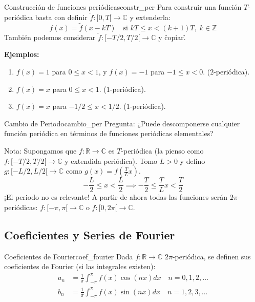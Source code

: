 \begin{nota}{Construcción de funciones periódicas}{constr_per}
Para construir una función $T$-periódica basta con definir $\tilde{f}: [0, T[ \to \mathbb{C}$ y extenderla:
$$ f(x) = \tilde{f}(x - kT) \quad \text{si } kT \le x < (k+1)T, \; k \in \mathbb{Z} $$
También podemos considerar $\tilde{f}: [-T/2, T/2[ \to \mathbb{C}$ y \"copiar\".

\textbf{Ejemplos:}
\begin{enumerate}
    \item $f(x) = 1$ para $0 \le x < 1$, y $f(x) = -1$ para $-1 \le x < 0$. ($2$-periódica).
    \item $f(x) = x$ para $0 \le x < 1$. ($1$-periódica).
    \item $f(x) = x$ para $-1/2 \le x < 1/2$. ($1$-periódica).
\end{enumerate}
\end{nota}

\begin{observacion}{Cambio de Periodo}{cambio_per}
Pregunta: ¿Puede descomponerse cualquier función periódica en términos de funciones periódicas elementales?

Nota: Supongamos que $f: \mathbb{R} \to \mathbb{C}$ es $T$-periódica (la pienso como $f: [-T/2, T/2[ \to \mathbb{C}$ y extendida periódica). Tomo $L > 0$ y defino $g: [-L/2, L/2[ \to \mathbb{C}$ como $g(x) = f\left(\frac{T}{L}x\right)$.
$$ -\frac{L}{2} \le x < \frac{L}{2} \implies -\frac{T}{2} \le \frac{T}{L}x < \frac{T}{2} $$
¡El periodo no es relevante! A partir de ahora todas las funciones serán $2\pi$-periódicas:
$f: [-\pi, \pi[ \to \mathbb{C}$ o $f: [0, 2\pi[ \to \mathbb{C}$.
\end{observacion}

\subsection{Coeficientes y Series de Fourier}

\begin{definicion}{Coeficientes de Fourier}{coef_fourier}
Dada $f: \mathbb{R} \to \mathbb{C}$ $2\pi$-periódica, se definen sus coeficientes de Fourier (si las integrales existen):
\begin{align*}
    a_n &= \frac{1}{\pi} \int_{-\pi}^{\pi} f(x) \cos(nx) dx \quad n = 0, 1, 2, \dots \\
    b_n &= \frac{1}{\pi} \int_{-\pi}^{\pi} f(x) \sin(nx) dx \quad n = 1, 2, 3, \dots
\end{align*}
\end{definicion}


